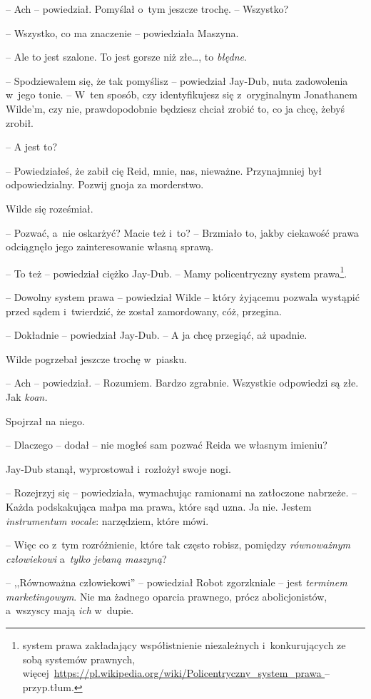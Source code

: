 \documentclass[oneside,polish,11pt,sfheadings]{mwbk}
\begin{document}
-- Ach -- powiedział. Pomyślał o~tym jeszcze trochę. -- Wszystko?

-- Wszystko, co ma znaczenie -- powiedziała Maszyna.

-- Ale to jest szalone. To jest gorsze niż złe\ldots, to \emph{błędne}.

-- Spodziewałem się, że tak pomyślisz -- powiedział Jay-Dub, nuta
zadowolenia w~jego tonie. -- W~ten sposób, czy identyfikujesz się z~oryginalnym Jonathanem Wilde'm, czy nie, prawdopodobnie będziesz chciał
zrobić to, co ja chcę, żebyś zrobił.

-- A jest to?

-- Powiedziałeś, że zabił cię Reid, mnie, nas, nieważne. Przynajmniej był
odpowiedzialny. Pozwij gnoja za morderstwo.

Wilde się roześmiał. 

-- Pozwać, a~nie oskarżyć? Macie też i~to? -- Brzmiało to, jakby ciekawość prawa odciągnęło jego zainteresowanie
własną sprawą.

-- To też -- powiedział ciężko Jay-Dub. -- Mamy policentryczny system
prawa\footnote{system prawa zakładający współistnienie niezależnych i~konkurujących ze sobą systemów prawnych,
więcej~\url{https://pl.wikipedia.org/wiki/Policentryczny_system_prawa
} -- przyp.tłum.}.


-- Dowolny system prawa -- powiedział Wilde -- który żyjącemu pozwala
wystąpić przed sądem i~twierdzić, że został zamordowany, cóż, przegina.

-- Dokładnie -- powiedział Jay-Dub. -- A ja chcę przegiąć, aż upadnie.

Wilde pogrzebał jeszcze trochę w~piasku.

-- Ach -- powiedział. -- Rozumiem. Bardzo zgrabnie. Wszystkie odpowiedzi są
złe. Jak \emph{koan.}

Spojrzał na niego.

-- Dlaczego -- dodał -- nie mogłeś sam pozwać Reida we własnym imieniu?

Jay-Dub stanął, wyprostował i~rozłożył swoje nogi. 

-- Rozejrzyj się -- powiedziała, wymachując ramionami na zatłoczone nabrzeże. -- Każda
podskakująca małpa ma prawa, które sąd uzna. Ja nie. Jestem
\emph{instrumentum vocale}: narzędziem, które mówi.

-- Więc co z~tym rozróżnienie, które tak często robisz, pomiędzy
\emph{równoważnym człowiekowi} a~\emph{tylko jebaną maszyną}?

-- ,,Równoważna człowiekowi'' -- powiedział Robot zgorzkniale -- jest
\emph{terminem marketingowym}. Nie ma żadnego oparcia prawnego, prócz
abolicjonistów, a~wszyscy mają \emph{ich} w~dupie.
\end{document}
